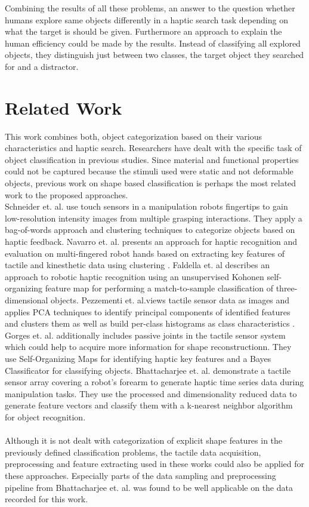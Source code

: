 Combining the results of all these problems, an answer to the question whether humans explore same objects differently in a haptic search task depending on what the target is should be given. Furthermore an approach to explain the human efficiency could be made by the results. Instead of classifying all explored objects, they distinguish just between two classes, the target object they searched for and a distractor.      
\section{Related Work}
This work combines both, object categorization based on their various characteristics and haptic search. Researchers have dealt with the specific task of object classification in previous studies. Since material and functional properties could not be captured because the stimuli used were static and not deformable objects, previous work on shape based classification is perhaps the most related work to the proposed approaches.\\
Schneider et. al. \cite{Schneider} use touch sensors in a manipulation robots fingertips to gain low-resolution intensity images from multiple grasping interactions. They apply a bag-of-words approach and clustering techniques to categorize objects based on haptic feedback. Navarro et. al. presents an approach for haptic recognition and evaluation on multi-fingered robot hands based on extracting key features of tactile and kinesthetic data using clustering \cite{Navarro}. Faldella et. al \cite{Faldella} describes an approach to robotic haptic recognition using an unsupervised Kohonen self-organizing feature map for performing a match-to-sample classification of three-dimensional objects. Pezzementi et. al.views tactile sensor data as images and applies PCA techniques to identify principal components of identified features and clusters them as well as build per-class histograms as class characteristics \cite{Pezzementi}. Gorges et. al. \cite{Gorges} additionally includes passive joints in the tactile sensor system which could help to acquire more information for shape reconstructionn. They use Self-Organizing Maps for identifying haptic key features and a Bayes Classificator for classifying objects. Bhattacharjee et. al. \cite{Bhattacharjee} demonstrate a tactile sensor array covering a robot's forearm to generate haptic time series data during manipulation tasks. They use the processed and dimensionality reduced data to generate feature vectors and classify them with a k-nearest neighbor algorithm for object recognition.
\\\\
Although it is not dealt with categorization of explicit shape features in the previously defined classification problems, the tactile data acquisition, preprocessing and feature extracting used in these works could also be applied for these approaches. Especially parts of the data sampling and preprocessing pipeline from Bhattacharjee et. al. \cite{Bhattacharjee} was found to be well applicable on the data recorded for this work.

